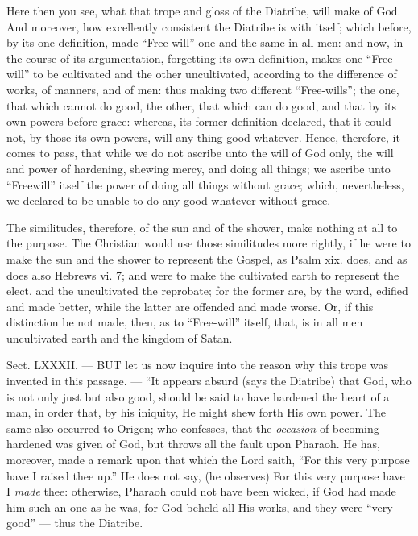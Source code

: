 Here then you see, what that trope and gloss of the Diatribe, will make of God. And moreover, how excellently consistent the Diatribe is with itself; which before, by its one definition, made “Free-will” one and the same in all men: and now, in the course of its argumentation, forgetting its own definition, makes one “Free-will” to be cultivated and the other uncultivated, according to the difference of works, of manners, and of men: thus making two different “Free-wills”; the one, that which cannot do good, the other, that which can do good, and that by its own powers before grace: whereas, its former definition declared, that it could not, by those its own powers, will any thing good whatever. Hence, therefore, it comes to pass, that while we do not ascribe unto the will of God only, the will and power of hardening, shewing mercy, and doing all things; we ascribe unto “Freewill” itself the power of doing all things without grace; which, nevertheless, we declared to be unable to do any good whatever without grace.

The similitudes, therefore, of the sun and of the shower, make nothing at all to the purpose. The Christian would use those similitudes more rightly, if he were to make the sun and the shower to represent the Gospel, as Psalm xix. does, and as does also Hebrews vi. 7; and were to make the cultivated earth to represent the elect, and the uncultivated the reprobate; for the former are, by the word, edified and made better, while the latter are offended and made worse. Or, if this distinction be not made, then, as to “Free-will” itself, that, is in all men uncultivated earth and the kingdom of Satan.


Sect. LXXXII. — BUT let us now inquire into the reason why this trope was invented in this passage. — “It appears absurd (says the Diatribe) that God, who is not only just but also good, should be said to have hardened the heart of a man, in order that, by his iniquity, He might shew forth His own power. The same also occurred to Origen; who confesses, that the \emph{occasion }of becoming hardened was given of God, but throws all the fault upon Pharaoh. He has, moreover, made a remark upon that which the Lord saith, “For this very purpose have I raised thee up.” He does not say, (he observes) For this very purpose have I \emph{made }thee: otherwise, Pharaoh could not have been wicked, if God had made him such an one as he was, for God beheld all His works, and they were “very good” — thus the Diatribe.

